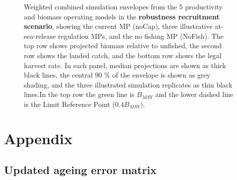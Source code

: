 \documentclass[11pt]{book}
\begin{document}
\begin{landscape}
\begin{figure}[htb]
{\centering {} 

}

\caption{Weighted combined simulation envelopes from the 5 productivity and biomass operating models in the \textbf{robustness recruitment scenario}, showing the current MP (noCap), three illustrative at-sea-release regulation MPs, and the no fishing MP (NoFish). The top row shows projected biomass relative to unfished, the second row shows the landed catch, and the bottom row shows the legal harvest rate. In each panel, median projections are shown as thick black lines, the central 90 \% of the envelope is shown as grey shading, and the three illustrated simulation replicates as thin black lines.In the top row the green line is $B_{MSY}$ and the lower dashed line is the Limit Reference Point (0.4$B_{MSY}$).}\label{fig:unnamed-chunk-26}
\end{figure}
\end{landscape}
\hypertarget{appendix}{%
\section{\texorpdfstring{Appendix\label{sec:app-minor}}{Appendix}}\label{appendix}}

\hypertarget{updated-ageing-error-matrix}{%
\subsection{Updated ageing error matrix}\label{updated-ageing-error-matrix}}
\end{document}

